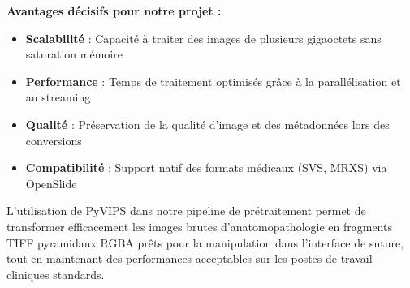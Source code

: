 \textbf{Avantages décisifs pour notre projet :}

\begin{itemize}[leftmargin=*]
    \item \textbf{Scalabilité} : Capacité à traiter des images de plusieurs gigaoctets sans saturation mémoire
    \item \textbf{Performance} : Temps de traitement optimisés grâce à la parallélisation et au streaming
    \item \textbf{Qualité} : Préservation de la qualité d'image et des métadonnées lors des conversions
    \item \textbf{Compatibilité} : Support natif des formats médicaux (SVS, MRXS) via OpenSlide
\end{itemize}

L'utilisation de PyVIPS dans notre pipeline de prétraitement permet de transformer efficacement les images brutes d'anatomopathologie en fragments TIFF pyramidaux RGBA prêts pour la manipulation dans l'interface de suture, tout en maintenant des performances acceptables sur les postes de travail cliniques standards.